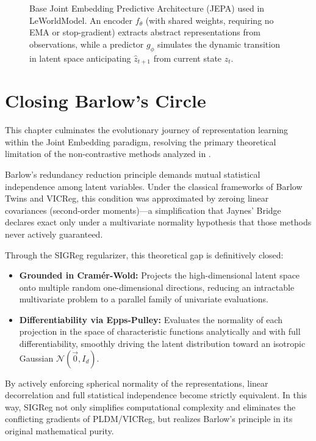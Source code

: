 \documentclass[11pt, oneside, openany]{book}
\begin{document}
\begin{figure}[H]
{\begin{tikzpicture}
\end{tikzpicture}
}
\caption{Base Joint Embedding Predictive Architecture (JEPA) used in LeWorldModel. An encoder $f_\theta$ (with shared weights, requiring no EMA or stop-gradient) extracts abstract representations from observations, while a predictor $g_\phi$ simulates the dynamic transition in latent space anticipating $\hat{z}_{t+1}$ from current state $z_t$.}
\label{fig:7.3}
\end{figure}

\section{Closing Barlow's Circle}
\label{sec:7.4}

This chapter culminates the evolutionary journey of representation learning within the Joint Embedding paradigm, resolving the primary theoretical limitation of the non-contrastive methods analyzed in .

Barlow's redundancy reduction principle \cite{barlow1961possible} demands mutual statistical independence among latent variables. Under the classical frameworks of Barlow Twins and VICReg, this condition was approximated by zeroing linear covariances (second-order moments)---a simplification that Jaynes' Bridge declares exact only under a multivariate normality hypothesis that those methods never actively guaranteed.

Through the SIGReg regularizer, this theoretical gap is definitively closed:
\begin{itemize}
    \item \textbf{Grounded in Cram\'er-Wold:} Projects the high-dimensional latent space onto multiple random one-dimensional directions, reducing an intractable multivariate problem to a parallel family of univariate evaluations.
    \item \textbf{Differentiability via Epps-Pulley:} Evaluates the normality of each projection in the space of characteristic functions analytically and with full differentiability, smoothly driving the latent distribution toward an isotropic Gaussian $\mathcal{N}(\vec{0}, I_{d})$.
\end{itemize}

By actively enforcing spherical normality of the representations, linear decorrelation and full statistical independence become strictly equivalent. In this way, SIGReg not only simplifies computational complexity and eliminates the conflicting gradients of PLDM/VICReg, but realizes Barlow's principle in its original mathematical purity.
\end{document}
